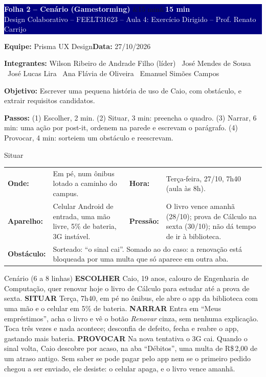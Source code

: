 \documentclass[10pt,a4paper]{article}
\newcommand{\equipenome}{Prisma UX Design}
\newcommand{\dataentrega}{27/10/2026}
\newcommand{\integrantes}{Wilson Ribeiro de Andrade Filho (líder) \textbullet\ José Mendes de Sousa \textbullet\ José Lucas Lira \textbullet\ Ana Flávia de Oliveira \textbullet\ Emanuel Simões Campos}
\newcommand{\folha}[2]{%
  \noindent
  \colorbox{navy}{\parbox{\dimexpr\linewidth-2\fboxsep\relax}{%
    \vspace{3pt}%
    \textcolor{white}{\bfseries\large #1}\hfill
    \ifx&#2&\else\colorbox{laranja}{\textcolor{white}{\bfseries\small #2}}\fi\\[1pt]
    \textcolor{white}{\scriptsize Design Colaborativo -- FEELT31623 -- Aula 4: Exercício Dirigido -- Prof. Renato Carrijo}%
    \vspace{3pt}}}%
  \par\vspace{5pt}
  {\small\textbf{Equipe:} \equipenome\hfill\textbf{Data:} \dataentrega\par}
  {\scriptsize\color{subtle}\textbf{Integrantes:} \integrantes\par}
  \vspace{4pt}}
\newcommand{\objetivo}[1]{%
  \begin{tcolorbox}[colback=laranjabg,colframe=laranja,boxrule=0.5pt,arc=0pt,
    left=3pt,right=3pt,top=1pt,bottom=1pt,fontupper=\small]
  \textbf{Objetivo:} #1
  \end{tcolorbox}\vspace{-4pt}}
\newcommand{\passos}[1]{{\footnotesize\textbf{Passos:} #1\par}\vspace{4pt}}
\newcommand{\mov}[1]{\colorbox{laranjabg}{\textcolor{amber}{\scriptsize\bfseries #1}}}
\begin{document}
\newpage
\folha{Folha 2 -- Cenário (Gamestorming)}{15 min}
\objetivo{Escrever uma pequena história de uso de Caio, com obstáculo, e extrair requisitos candidatos.}
\passos{(1) Escolher, 2 min. (2) Situar, 3 min: preencha o quadro. (3) Narrar, 6 min: uma ação por post-it, ordenem na parede e escrevam o parágrafo. (4) Provocar, 4 min: sorteiem um obstáculo e reescrevam.}

\begin{caixa}{Situar}
\renewcommand{\arraystretch}{1.35}%
\begin{tabularx}{\linewidth}{@{}>{\bfseries}p{2.2cm}X>{\bfseries}p{1.8cm}X@{}}
Onde: & Em pé, num ônibus lotado a caminho do campus. & Hora: & Terça-feira, 27/10, 7h40 (aula às 8h). \\
Aparelho: & Celular Android de entrada, uma mão livre, 5\% de bateria, 3G instável. & Pressão: & O livro vence amanhã (28/10); prova de Cálculo na sexta (30/10); não dá tempo de ir à biblioteca. \\
Obstáculo: & \multicolumn{3}{X}{Sorteado: ``o sinal cai''. Somado ao do caso: a renovação está bloqueada por uma multa que só aparece em outra aba.} \\
\end{tabularx}
\end{caixa}

\begin{caixa}{Cenário (6 a 8 linhas)}
\setlength{\parskip}{0pt}\linespread{1.25}\selectfont
\mov{ESCOLHER} Caio, 19 anos, calouro de Engenharia de Computação, quer renovar hoje o livro de Cálculo para estudar até a prova de sexta.
\mov{SITUAR} Terça, 7h40, em pé no ônibus, ele abre o app da biblioteca com uma mão e o celular em 5\% de bateria.
\mov{NARRAR} Entra em ``Meus empréstimos'', acha o livro e vê o botão \textit{Renovar} cinza, sem nenhuma explicação. Toca três vezes e nada acontece; desconfia de defeito, fecha e reabre o app, gastando mais bateria.
\mov{PROVOCAR} Na nova tentativa o 3G cai. Quando o sinal volta, Caio descobre por acaso, na aba ``Débitos'', uma multa de R\$\,2,00 de um atraso antigo. Sem saber se pode pagar pelo app nem se o primeiro pedido chegou a ser enviado, ele desiste: o celular apaga, e o livro vence amanhã.
\end{caixa}
\end{document}
